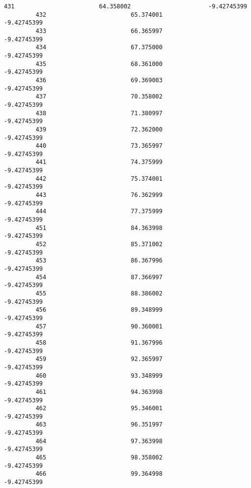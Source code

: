 \documentclass[11pt]{article}
\begin{document}
\begin{Verbatim}[commandchars=\\\{\}]
         431                        64.358002                      -9.42745399   
         432                        65.374001                      -9.42745399   
         433                        66.365997                      -9.42745399   
         434                        67.375000                      -9.42745399   
         435                        68.361000                      -9.42745399   
         436                        69.369003                      -9.42745399   
         437                        70.358002                      -9.42745399   
         438                        71.380997                      -9.42745399   
         439                        72.362000                      -9.42745399   
         440                        73.365997                      -9.42745399   
         441                        74.375999                      -9.42745399   
         442                        75.374001                      -9.42745399   
         443                        76.362999                      -9.42745399   
         444                        77.375999                      -9.42745399   
         451                        84.363998                      -9.42745399   
         452                        85.371002                      -9.42745399   
         453                        86.367996                      -9.42745399   
         454                        87.366997                      -9.42745399   
         455                        88.386002                      -9.42745399   
         456                        89.348999                      -9.42745399   
         457                        90.360001                      -9.42745399   
         458                        91.367996                      -9.42745399   
         459                        92.365997                      -9.42745399   
         460                        93.348999                      -9.42745399   
         461                        94.363998                      -9.42745399   
         462                        95.346001                      -9.42745399   
         463                        96.351997                      -9.42745399   
         464                        97.363998                      -9.42745399   
         465                        98.358002                      -9.42745399   
         466                        99.364998                      -9.42745399   
         

\end{Verbatim}
\end{document}
